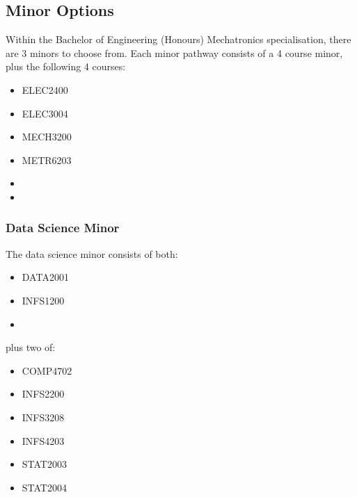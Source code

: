 \documentclass[a4paper,12pt]{report}
\begin{document}
\subsection{Minor Options}
Within the Bachelor of Engineering (Honours) Mechatronics specialisation, there are 3 minors to choose from. Each minor pathway consists of a 4 course minor, plus the following 4 courses:
\begin{multicols}{3}
    \begin{itemize}
        \item ELEC2400
        \item ELEC3004
        \item MECH3200
        \item METR6203
        \item[]
        \item[]
    \end{itemize}
\end{multicols}

\subsubsection{Data Science Minor}
The data science minor consists of both:
\begin{multicols}{3}
    \begin{itemize}
        \item DATA2001
        \item INFS1200
        \item[]
    \end{itemize}
\end{multicols}
plus two of:
\begin{multicols}{3}
    \begin{itemize}
        \item COMP4702
        \item INFS2200
        \item INFS3208
        \item INFS4203
        \item STAT2003
        \item STAT2004
    \end{itemize}
\end{multicols}
\end{document}
